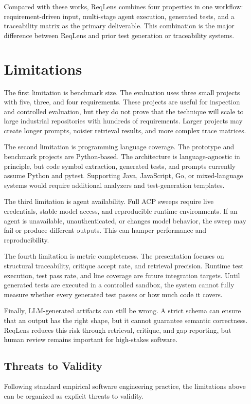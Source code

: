 \documentclass[conference]{IEEEtran}
\begin{document}
Compared with these works, ReqLens combines four properties in one workflow:
requirement-driven input, multi-stage agent execution, generated tests, and a
traceability matrix as the primary deliverable. This combination is the major
difference between ReqLens and prior test generation or traceability systems.

\section{Limitations}
The first limitation is benchmark size. The evaluation uses three small
projects with five, three, and four requirements. These projects are useful for
inspection and controlled evaluation, but they do not prove that the technique
will scale to large industrial repositories with hundreds of requirements.
Larger projects may create longer prompts, noisier retrieval results, and more
complex trace matrices.

The second limitation is programming language coverage. The prototype and
benchmark projects are Python-based. The architecture is language-agnostic in
principle, but code symbol extraction, generated tests, and prompts currently
assume Python and pytest. Supporting Java, JavaScript, Go, or mixed-language
systems would require additional analyzers and test-generation templates.

The third limitation is agent availability. Full ACP sweeps require live
credentials, stable model access, and reproducible runtime environments. If an
agent is unavailable, unauthenticated, or changes model behavior, the sweep may
fail or produce different outputs. This can hamper performance and
reproducibility.

The fourth limitation is metric completeness. The presentation focuses on
structural traceability, critique accept rate, and retrieval precision. Runtime
test execution, test pass rate, and line coverage are future integration
targets. Until generated tests are executed in a controlled sandbox, the system
cannot fully measure whether every generated test passes or how much code it
covers.

Finally, LLM-generated artifacts can still be wrong. A strict schema can ensure
that an output has the right shape, but it cannot guarantee semantic
correctness. ReqLens reduces this risk through retrieval, critique, and gap
reporting, but human review remains important for high-stakes software.

\subsection{Threats to Validity}
Following standard empirical software engineering practice, the limitations
above can be organized as explicit threats to validity.
\end{document}
